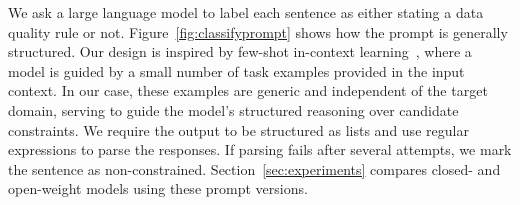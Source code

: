 We ask a large language model to label each sentence as either stating a data quality rule or not. Figure~\ref{fig:classifyprompt} shows how the prompt is generally structured. 
Our design is inspired by few-shot in-context learning~\cite{brown2020language}, where a model is guided by a small number of task examples provided in the input context. In our case, these examples are generic and independent of the target domain, serving to guide the model’s structured reasoning over candidate constraints.
We require the output to be structured as lists and use regular expressions to parse the responses. If parsing fails after several attempts, we mark the sentence as non-constrained. Section~\ref{sec:experiments} compares closed- and open-weight models using these prompt versions.


